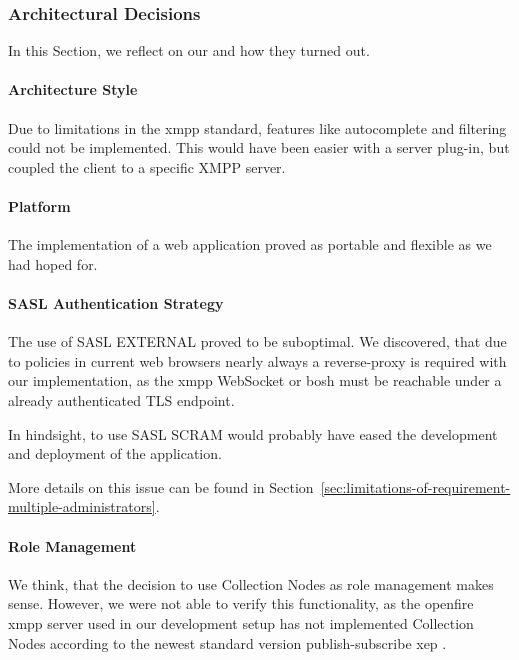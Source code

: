 \subsubsection{Architectural Decisions}
In this Section, we reflect on our  and how they turned out.

\paragraph{Architecture Style}
Due to limitations in the \gls{xmpp} standard, features like autocomplete and filtering could not be implemented.
This would have been easier with a server plug-in, but coupled the client to a specific XMPP server.

\paragraph{Platform}
The implementation of a web application proved as portable and flexible as we had hoped for.

\paragraph{SASL Authentication Strategy}
The use of SASL EXTERNAL proved to be suboptimal.
We discovered, that due to policies in current web browsers nearly always a reverse-proxy is required with our implementation, as the \gls{xmpp} WebSocket or \gls{bosh} must be reachable under a already authenticated TLS endpoint.

In hindsight, to use SASL SCRAM would probably have eased the development and deployment of the application.

More details on this issue can be found in Section~\ref{sec:limitations-of-requirement-multiple-administrators}.

\paragraph{Role Management}
We think, that the decision to use Collection Nodes as role management makes sense.
However, we were not able to verify this functionality, as the openfire \gls{xmpp} server used in our development setup has not implemented Collection Nodes according to the newest standard version \gls{publish-subscribe} \gls{xep} \cite{xep-0248}.

